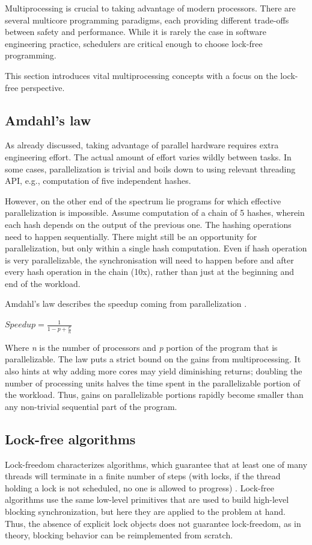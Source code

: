 \documentclass[12pt,a4paper,twoside]{report}
\begin{document}
Multiprocessing is crucial to taking advantage of modern processors. There are several multicore programming paradigms, each providing different trade-offs between safety and performance. While it is rarely the case in software engineering practice, schedulers are critical enough to choose lock-free programming. 

This section introduces vital multiprocessing concepts with a focus on the lock-free perspective.  

\subsection{Amdahl's law}
As already discussed, taking advantage of parallel hardware requires extra engineering effort. The actual amount of effort varies wildly between tasks. In some cases, parallelization is trivial and boils down to using relevant threading API, e.g., computation of five independent hashes. 

However, on the other end of the spectrum lie programs for which effective parallelization is impossible. Assume computation of a chain of 5 hashes, wherein each hash depends on the output of the previous one. The hashing operations need to happen sequentially. There might still be an opportunity for parallelization, but only within a single hash computation. Even if hash operation is very parallelizable, the synchronisation will need to happen before and after every hash operation in the chain (10x), rather than just at the beginning and end of the workload. 

Amdahl's law describes the speedup coming from parallelization \cite{art_of_mult}.

\begin{center}
$Speedup = \frac{1}{1 - p + \frac{p}{n}}$
\end{center} 

Where \textit{n} is the number of processors and \textit{p} portion of the program that is parallelizable. The law puts a strict bound on the gains from multiprocessing. It also hints at why adding more cores may yield diminishing returns; doubling the number of processing units halves the time spent in the parallelizable portion of the workload. Thus, gains on parallelizable portions rapidly become smaller than any non-trivial sequential part of the program. 

\subsection{Lock-free algorithms}
Lock-freedom characterizes algorithms, which guarantee that at least one of many threads will terminate in a finite number of steps (with locks, if the thread holding a lock is not scheduled, no one is allowed to progress) \cite{art_of_mult}. Lock-free algorithms use the same low-level primitives that are used to build high-level blocking synchronization, but here they are applied to the problem at hand. Thus, the absence of explicit lock objects does not guarantee lock-freedom, as in theory, blocking behavior can be reimplemented from scratch. 
\end{document}
